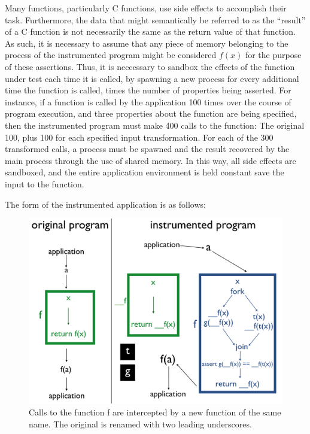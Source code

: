 \documentclass[notitlepage]{article}
\begin{document}
Many functions, particularly C functions, use side effects to accomplish their task. Furthermore, the data that might semantically be referred to as the ``result'' of a C function is not necessarily the same as the return value of that function. As such, it is necessary to assume that any piece of memory belonging to the process of the instrumented program might be considered $f(x)$ for the purpose of these assertions. Thus, it is neccessary to sandbox the effects of the function under test each time it is called, by spawning a new process for every additional time the function is called, times the number of properties being asserted. For instance, if a function is called by the application 100 times over the course of program execution, and three properties about the function are being specified, then the instrumented program must make 400 calls to the function: The original 100, plus 100 for each specified input transformation. For each of the 300 transformed calls, a process must be spawned and the result recovered by the main process through the use of shared memory. In this way, all side effects are sandboxed, and the entire application environment is held constant save the input to the function.

The form of the instrumented application is as follows:

\begin{figure}[ht!]
\centering
\includegraphics[width=175mm]{calico_pic2.png}
\caption{Calls to the function f are intercepted by a new function of the same name. The original is renamed with two leading underscores.}
\end{figure}
\end{document}

